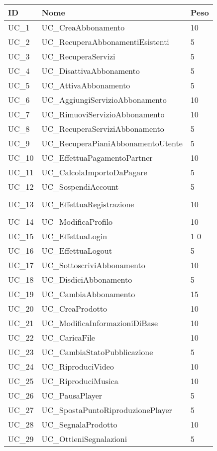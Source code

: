 \begin{table}[hb]
    \centering
\begin{tabular}{ |P{3.5cm}|P{5cm}|P{3.5cm}|  }
\hline
\textbf{ID} & \textbf{Nome} & \textbf{Peso} \\\hline
UC\_1 & UC\_CreaAbbonamento & 10\\
UC\_2 & UC\_RecuperaAbbonamentiEsistenti & 5\\
UC\_3 & UC\_RecuperaServizi & 5\\
UC\_4 & UC\_DisattivaAbbonamento & 5\\
UC\_5 & UC\_AttivaAbbonamento & 5\\
UC\_6 & UC\_AggiungiServizioAbbonamento & 10\\
UC\_7 & UC\_RimuoviServizioAbbonamento & 10\\
UC\_8 & UC\_RecuperaServiziAbbonamento & 5\\
UC\_9 & UC\_RecuperaPianiAbbonamentoUtente & 5\\
UC\_10 & UC\_EffettuaPagamentoPartner & 10\\
UC\_11 & UC\_CalcolaImportoDaPagare & 5\\
UC\_12 & UC\_SospendiAccount & 5\\\\
UC\_13 & UC\_EffettuaRegistrazione & 10\\\\
UC\_14 & UC\_ModificaProfilo & 10\\
UC\_15 & UC\_EffettuaLogin &1 0\\
UC\_16 & UC\_EffettuaLogout & 5\\
UC\_17 & UC\_SottoscriviAbbonamento & 10\\
UC\_18 & UC\_DisdiciAbbonamento & 5\\
UC\_19 & UC\_CambiaAbbonamento & 15\\
UC\_20 & UC\_CreaProdotto & 10\\
UC\_21 & UC\_ModificaInformazioniDiBase & 10\\
UC\_22 & UC\_CaricaFile & 10\\
UC\_23 & UC\_CambiaStatoPubblicazione & 5\\
UC\_24 & UC\_RiproduciVideo & 10\\
UC\_25 & UC\_RiproduciMusica & 10\\
UC\_26 & UC\_PausaPlayer & 5\\
UC\_27 & UC\_SpostaPuntoRiproduzionePlayer & 5\\
UC\_28 & UC\_SegnalaProdotto & 10\\
UC\_29 & UC\_OttieniSegnalazioni & 5\\

\end{tabular}
\end{table}
